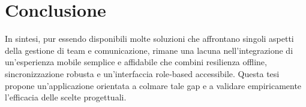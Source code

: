 \section{Conclusione}
In sintesi, pur essendo disponibili molte soluzioni che affrontano singoli aspetti della gestione di team e comunicazione, rimane una lacuna nell'integrazione di un'esperienza mobile semplice e affidabile che combini resilienza offline, sincronizzazione robusta e un'interfaccia role‑based accessibile. Questa tesi propone un'applicazione orientata a colmare tale gap e a validare empiricamente l'efficacia delle scelte progettuali.

